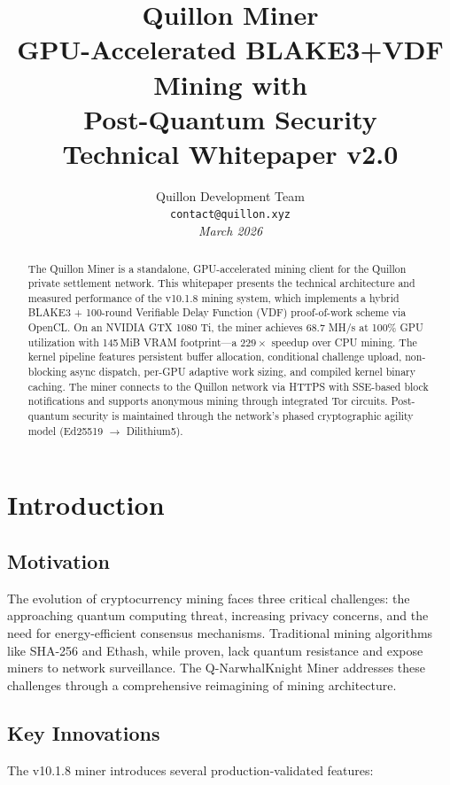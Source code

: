 \documentclass[11pt,a4paper]{article}
\title{\huge \textbf{Quillon Miner} \\[0.5cm]
\Large GPU-Accelerated BLAKE3+VDF Mining with\\Post-Quantum Security \\[0.3cm]
\large Technical Whitepaper v2.0}
\author{
Quillon Development Team\\
\texttt{contact@quillon.xyz}\\[0.5cm]
\textit{March 2026}
}
\date{}
\begin{document}
\maketitle

\begin{abstract}
The Quillon Miner is a standalone, GPU-accelerated mining client for the Quillon private settlement network. This whitepaper presents the technical architecture and measured performance of the v10.1.8 mining system, which implements a hybrid BLAKE3 + 100-round Verifiable Delay Function (VDF) proof-of-work scheme via OpenCL. On an NVIDIA GTX 1080 Ti, the miner achieves 68.7 MH/s at 100\% GPU utilization with 145\,MiB VRAM footprint---a $229\times$ speedup over CPU mining. The kernel pipeline features persistent buffer allocation, conditional challenge upload, non-blocking async dispatch, per-GPU adaptive work sizing, and compiled kernel binary caching. The miner connects to the Quillon network via HTTPS with SSE-based block notifications and supports anonymous mining through integrated Tor circuits. Post-quantum security is maintained through the network's phased cryptographic agility model (Ed25519 $\to$ Dilithium5).
\end{abstract}

\tableofcontents
\newpage

\section{Introduction}

\subsection{Motivation}

The evolution of cryptocurrency mining faces three critical challenges: the approaching quantum computing threat, increasing privacy concerns, and the need for energy-efficient consensus mechanisms. Traditional mining algorithms like SHA-256 and Ethash, while proven, lack quantum resistance and expose miners to network surveillance. The Q-NarwhalKnight Miner addresses these challenges through a comprehensive reimagining of mining architecture.

\subsection{Key Innovations}

The v10.1.8 miner introduces several production-validated features:
\end{document}
